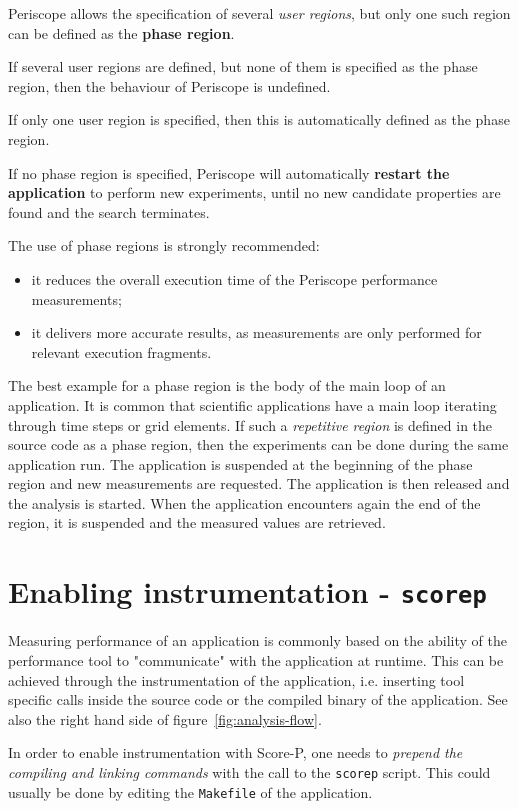 \documentclass[11pt,oneside,a4paper]{book}
\begin{document}
Periscope allows the specification of several \textit{user regions}, but only one such region can be defined as the \textbf{phase region}.

If several user regions are defined, but none of them is specified as the phase region, then the behaviour of Periscope is undefined.

If only one user region is specified, then this is automatically defined as the phase region.

If no phase region is specified, Periscope will automatically \textbf{restart the application} to perform new experiments, until no new candidate properties are found and the search terminates.

The use of phase regions is strongly recommended:
\begin{itemize}
	\item it reduces the overall execution time of the Periscope performance measurements;
	\item it delivers more accurate results, as measurements are only performed for relevant execution fragments.
\end{itemize}

The best example for a phase region is the body of the main loop of an application. It is common that scientific applications have a main loop iterating through time steps or grid elements. If such a \textit{repetitive region} is defined in the source code as a phase region, then the experiments can be done during the same application run. The application is suspended at the beginning of the phase region and new measurements are requested. The application is then released and the analysis is started. When the application encounters again the end of the region, it is suspended and the measured values are retrieved.


\section{Enabling instrumentation - \texttt{scorep}}

Measuring performance of an application is commonly based on the ability of the performance tool to "communicate" with the application at runtime. This can be achieved through the instrumentation of the application, i.e. inserting tool specific calls inside the source code or the compiled binary of the application. See also the right hand side of figure~\ref{fig:analysis-flow}.

In order to enable instrumentation with Score-P, one needs to \textit{prepend the compiling and linking commands} with the call to the \texttt{scorep} script. This could usually be done by editing the \texttt{Makefile} of the application.
\end{document}
